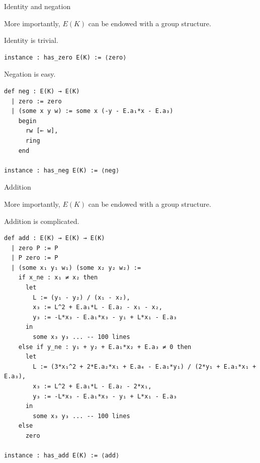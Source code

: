 \documentclass[10pt]{beamer}
\begin{document}
\begin{frame}[fragile, t]{Identity and negation}

More importantly, $ E(K) $ can be endowed with a group structure.

\vspace{0.5cm}

Identity is trivial.

\begin{lstlisting}[basicstyle=\scriptsize, frame=single]
instance : has_zero E(K) := ⟨zero⟩
\end{lstlisting}

Negation is easy.

\begin{lstlisting}[basicstyle=\scriptsize, frame=single]
def neg : E(K) → E(K)
  | zero := zero
  | (some x y w) := some x (-y - E.a₁*x - E.a₃)
    begin
      rw [← w],
      ring
    end

instance : has_neg E(K) := ⟨neg⟩
\end{lstlisting}

\end{frame}

\begin{frame}[fragile, t]{Addition}

More importantly, $ E(K) $ can be endowed with a group structure.

\vspace{0.5cm}

Addition is complicated.

\begin{lstlisting}[basicstyle=\scriptsize, frame=single]
def add : E(K) → E(K) → E(K)
  | zero P := P
  | P zero := P
  | (some x₁ y₁ w₁) (some x₂ y₂ w₂) :=
    if x_ne : x₁ ≠ x₂ then
      let
        L := (y₁ - y₂) / (x₁ - x₂),
        x₃ := L^2 + E.a₁*L - E.a₂ - x₁ - x₂,
        y₃ := -L*x₃ - E.a₁*x₃ - y₁ + L*x₁ - E.a₃
      in
        some x₃ y₃ ... -- 100 lines
    else if y_ne : y₁ + y₂ + E.a₁*x₂ + E.a₃ ≠ 0 then
      let
        L := (3*x₁^2 + 2*E.a₂*x₁ + E.a₄ - E.a₁*y₁) / (2*y₁ + E.a₁*x₁ + E.a₃),
        x₃ := L^2 + E.a₁*L - E.a₂ - 2*x₁,
        y₃ := -L*x₃ - E.a₁*x₃ - y₁ + L*x₁ - E.a₃
      in
        some x₃ y₃ ... -- 100 lines
    else
      zero

instance : has_add E(K) := ⟨add⟩
\end{lstlisting}

\end{frame}
\end{document}
